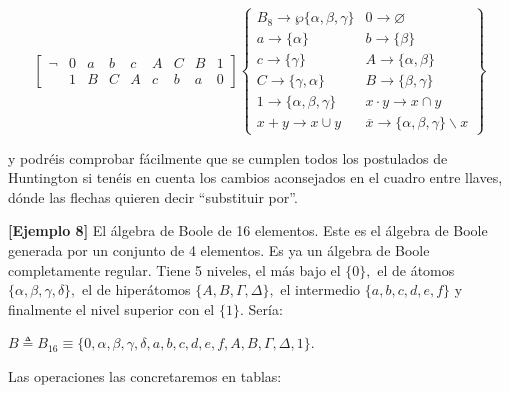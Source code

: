   \[\begin{bmatrix}
  \neg & 0 & a & b & c & A & C & B & 1 \\
   & 1 & B & C & A & c & b & a & 0
  \end{bmatrix}\begin{Bmatrix}
  {{B_{8}\rightarrow\wp}{\{{\alpha,\beta,\gamma}\}}} & {0\rightarrow\varnothing} \\
  {a\rightarrow{\{\alpha\}}} & {b\rightarrow{\{\beta\}}} \\
  {c\rightarrow{\{\gamma\}}} & {A\rightarrow{\{{\alpha,\beta}\}}} \\
  {C\rightarrow{\{{\gamma,\alpha}\}}} & {B\rightarrow{\{{\beta,\gamma}\}}} \\
  {1\rightarrow{\{{\alpha,\beta,\gamma}\}}} & {{x \cdot y}\rightarrow{x \cap y}} \\
  {{x + y}\rightarrow{x \cup y}} & {\overline{x}\rightarrow{{\{{\alpha,\beta,\gamma}\}} \smallsetminus x}}
  \end{Bmatrix}\]

  y podréis comprobar fácilmente que se cumplen todos los postulados de
  Huntington si te\-néis en cuenta los cambios aconsejados en el cuadro
  entre llaves, dónde las flechas quieren decir ``substituir por''.

  \textbf{{[}Ejemplo 8{]}} El álgebra de Boole de 16 elementos. Este es
  el álgebra de Boole generada por un conjunto de 4 elementos. Es ya un
  álgebra de Boole completamente regular. Tiene 5 niveles, el más bajo
  el $\{0\},$ el de átomos $\{\alpha,\beta,\gamma,\delta\},$ el
  de hiperátomos $\{A,B,\Gamma,\Delta\},$ el intermedio
  $\{a,b,c,d,e,f\}$ y finalmente el nivel superior con el $\{1\}.$
  Sería:

  $B \triangleq B_{16} \equiv \{0,\alpha,\beta,\gamma,\delta,a,b,c,d,e,f,A,B,\Gamma,\Delta,1\}.$

  Las operaciones las concretaremos en tablas:

  \setcounter{MaxMatrixCols}{20}
  \setlength{\arraycolsep}{8pt} %
  


